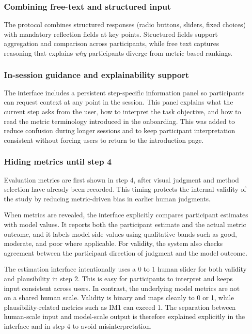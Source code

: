 \documentclass[
  letterpaper,
  DIV=11,
  numbers=noendperiod]{scrartcl}
\begin{document}
\subsubsection{Combining free-text and structured
input}\label{combining-free-text-and-structured-input}

The protocol combines structured responses (radio buttons, sliders,
fixed choices) with mandatory reflection fields at key points.
Structured fields support aggregation and comparison across
participants, while free text captures reasoning that explains
\emph{why} participants diverge from metric-based rankings.

\subsubsection{In-session guidance and explainability
support}\label{in-session-guidance-and-explainability-support}

The interface includes a persistent step-specific information panel so
participants can request context at any point in the session. This panel
explains what the current step asks from the user, how to interpret the
task objective, and how to read the metric terminology introduced in the
onboarding. This was added to reduce confusion during longer sessions
and to keep participant interpretation consistent without forcing users
to return to the introduction page.

\subsubsection{Hiding metrics until step
4}\label{hiding-metrics-until-step-4}

Evaluation metrics are first shown in step 4, after visual judgment and
method selection have already been recorded. This timing protects the
internal validity of the study by reducing metric-driven bias in earlier
human judgments.

When metrics are revealed, the interface explicitly compares participant
estimates with model values. It reports both the participant estimate
and the actual metric outcome, and it labels model-side values using
qualitative bands such as good, moderate, and poor where applicable. For
validity, the system also checks agreement between the participant
direction of judgment and the model outcome.

The estimation interface intentionally uses a 0 to 1 human slider for
both validity and plausibility in step 2. This is easy for participants
to interpret and keeps input consistent across users. In contrast, the
underlying model metrics are not on a shared human scale. Validity is
binary and maps cleanly to 0 or 1, while plausibility-related metrics
such as IM1 can exceed 1. The separation between human-scale input and
model-scale output is therefore explained explicitly in the interface
and in step 4 to avoid misinterpretation.
\end{document}
